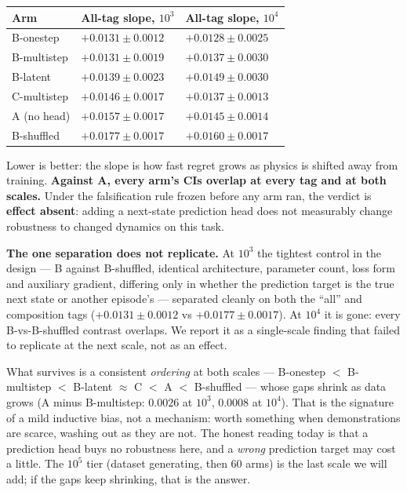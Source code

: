 \documentclass[10pt]{article}
\begin{document}
\begin{center}
\begin{tabular}{@{}lll@{}}
\toprule
\textbf{Arm} & \textbf{All-tag slope, $10^3$} & \textbf{All-tag slope, $10^4$} \\
\midrule
B-onestep         & $+0.0131 \pm 0.0012$ & $+0.0128 \pm 0.0025$ \\
B-multistep       & $+0.0131 \pm 0.0019$ & $+0.0137 \pm 0.0030$ \\
B-latent          & $+0.0139 \pm 0.0023$ & $+0.0149 \pm 0.0030$ \\
C-multistep       & $+0.0146 \pm 0.0017$ & $+0.0137 \pm 0.0013$ \\
A (no head)       & $+0.0157 \pm 0.0017$ & $+0.0145 \pm 0.0014$ \\
B-shuffled        & $+0.0177 \pm 0.0017$ & $+0.0160 \pm 0.0017$ \\
\bottomrule
\end{tabular}
\end{center}

Lower is better: the slope is how fast regret grows as physics is shifted away
from training. \textbf{Against A, every arm's CIs overlap at every tag and at
both scales.} Under the falsification rule frozen before any arm ran, the
verdict is \textbf{effect absent}: adding a next-state prediction head does not
measurably change robustness to changed dynamics on this task.

\textbf{The one separation does not replicate.} At $10^3$ the tightest control
in the design --- B against B-shuffled, identical architecture, parameter
count, loss form and auxiliary gradient, differing only in whether the
prediction target is the true next state or another episode's --- separated
cleanly on both the ``all'' and composition tags ($+0.0131\pm0.0012$ vs
$+0.0177\pm0.0017$). At $10^4$ it is gone: every B-vs-B-shuffled contrast
overlaps. We report it as a single-scale finding that failed to replicate at
the next scale, not as an effect.

What survives is a consistent \emph{ordering} at both scales --- B-onestep
$<$ B-multistep $<$ B-latent $\approx$ C $<$ A $<$ B-shuffled --- whose gaps
shrink as data grows (A minus B-multistep: $0.0026$ at $10^3$, $0.0008$ at
$10^4$). That is the signature of a mild inductive bias, not a mechanism:
worth something when demonstrations are scarce, washing out as they are not.
The honest reading today is that a prediction head buys no robustness here,
and a \emph{wrong} prediction target may cost a little. The $10^5$ tier
(dataset generating, then 60 arms) is the last scale we will add; if the gaps
keep shrinking, that is the answer.
\end{document}
